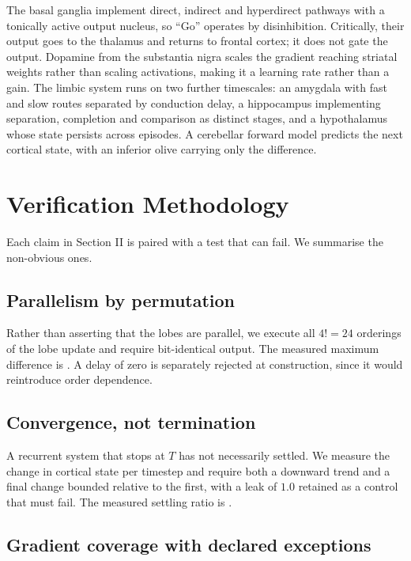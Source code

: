 \documentclass[conference]{IEEEtran}
\begin{document}
The basal ganglia implement direct, indirect and hyperdirect pathways with a
tonically active output nucleus, so ``Go'' operates by disinhibition. Critically,
their output goes to the thalamus and returns to frontal cortex; it does not
gate the output. Dopamine from the substantia nigra scales the gradient reaching
striatal weights rather than scaling activations, making it a learning rate
rather than a gain. The limbic system runs on two further timescales: an
amygdala with fast and slow routes separated by conduction delay, a hippocampus
implementing separation, completion and comparison as distinct stages, and a
hypothalamus whose state persists across episodes. A cerebellar forward model
predicts the next cortical state, with an inferior olive carrying only the
difference.

\section{Verification Methodology}

Each claim in Section II is paired with a test that can fail. We summarise the
non-obvious ones.

\subsection{Parallelism by permutation}

Rather than asserting that the lobes are parallel, we execute all $4! = 24$
orderings of the lobe update and require bit-identical output. The measured
maximum difference is \GatesPermutationGap{}. A delay of zero is separately
rejected at construction, since it would reintroduce order dependence.

\subsection{Convergence, not termination}

A recurrent system that stops at $T$ has not necessarily settled. We measure the
change in cortical state per timestep and require both a downward trend and a
final change bounded relative to the first, with a leak of $1.0$ retained as a
control that must fail. The measured settling ratio is \GatesSettlingRatio{}.

\subsection{Gradient coverage with declared exceptions}
\end{document}
